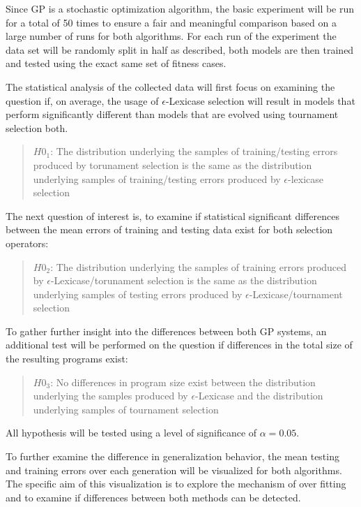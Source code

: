 \documentclass[
  12pt,
]{article}
\begin{document}
Since GP is a stochastic optimization algorithm, the basic experiment
will be run for a total of 50 times to ensure a fair and meaningful
comparison based on a large number of runs for both algorithms. For each
run of the experiment the data set will be randomly split in half as
described, both models are then trained and tested using the exact same
set of fitness cases.

The statistical analysis of the collected data will first focus on
examining the question if, on average, the usage of
\(\epsilon\)-Lexicase selection will result in models that perform
significantly different than models that are evolved using tournament
selection both.

\begin{quote}
\(H0_{1}\): The distribution underlying the samples of training/testing
errors produced by torunament selection is the same as the distribution
underlying samples of training/testing errors produced by
\(\epsilon\)-lexicase selection
\end{quote}

The next question of interest is, to examine if statistical significant
differences between the mean errors of training and testing data exist
for both selection operators:

\begin{quote}
\(H0_{2}\): The distribution underlying the samples of training errors
produced by \(\epsilon\)-Lexicase/torunament selection is the same as
the distribution underlying samples of testing errors produced by
\(\epsilon\)-Lexicase/tournament selection
\end{quote}

To gather further insight into the differences between both GP systems,
an additional test will be performed on the question if differences in
the total size of the resulting programs exist:

\begin{quote}
\(H0_{3}\): No differences in program size exist between the
distribution underlying the samples produced by \(\epsilon\)-Lexicase
and the distribution underlying samples of tournament selection
\end{quote}

All hypothesis will be tested using a level of significance of
\(\alpha=0.05\).

To further examine the difference in generalization behavior, the mean
testing and training errors over each generation will be visualized for
both algorithms. The specific aim of this visualization is to explore
the mechanism of over fitting and to examine if differences between both
methods can be detected.
\end{document}
